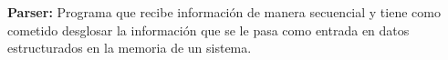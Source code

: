 



\textbf{Parser:} Programa que recibe información de manera secuencial y tiene como cometido desglosar la información que se le pasa como entrada en datos estructurados en la memoria de un sistema.